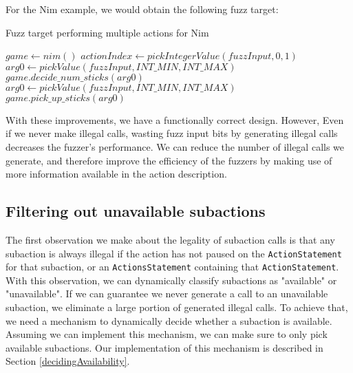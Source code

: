 For the Nim example, we would obtain the following fuzz target:
\begin{algorithm}[H]
    \caption{Fuzz target performing multiple actions for Nim}
    \begin{algorithmic}[1]
    \STATE $game \gets nim()$
        \STATE $actionIndex \gets pickIntegerValue(fuzzInput, 0, 1)$
            \STATE $arg0 \gets pickValue(fuzzInput, INT\_MIN, INT\_MAX)$
                \STATE $game.decide\_num\_sticks(arg0)$
            \ENDIF
        \ENDIF
            \STATE $arg0 \gets pickValue(fuzzInput, INT\_MIN, INT\_MAX)$
                \STATE $game.pick\_up\_sticks(arg0)$
            \ENDIF
        \ENDIF
    \ENDWHILE
    \end{algorithmic}
\end{algorithm}

With these improvements, we have a functionally correct design.
However, Even if we never make illegal calls, wasting fuzz input bits by generating illegal calls decreases the fuzzer's performance.
We can reduce the number of illegal calls we generate, and therefore improve the efficiency of the fuzzers by making use of more information available in the action description.

\subsection{Filtering out unavailable subactions}\label{filteringUnavailableSubactions}
The first observation we make about the legality of subaction calls is that any subaction is always illegal if the action has not paused on the \texttt{ActionStatement} for that subaction, or an \texttt{ActionsStatement} containing that \texttt{ActionStatement}.
With this observation, we can dynamically classify subactions as "available" or "unavailable".
If we can guarantee we never generate a call to an unavailable subaction, we eliminate a large portion of generated illegal calls.
To achieve that, we need a mechanism to dynamically decide whether a subaction is available.
Assuming we can implement this mechanism, we can make sure to only pick available subactions.
Our implementation of this mechanism is described in Section \ref{decidingAvailability}.

